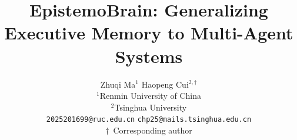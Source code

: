 %
%

\title{EpistemoBrain: Generalizing Executive Memory to Multi-Agent Systems}

\author{
  Zhuqi Ma$^1$ \qquad Haopeng Cui$^{2,\dagger}$\\
  $^1$Renmin University of China\\
  $^2$Tsinghua University\\
  \texttt{2025201699@ruc.edu.cn} \qquad \texttt{chp25@mails.tsinghua.edu.cn}\\
  $\dagger$\ Corresponding author
}

\maketitle

